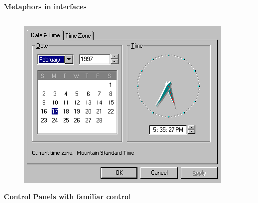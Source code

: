 \documentclass[pdf]{beamer}
\begin{document}
\begin{frame}
{\textbf{Metaphors in interfaces}}{\textcolor{red}{\rule{12cm}{1.2pt}}}

\begin{figure}
\includegraphics[scale=0.55]{3_Picture2.png}
\end{figure}

\begin{center}
\textbf{Control Panels with familiar control}
\end{center}
    
\vspace{50px}
\end{frame}
\end{document}

